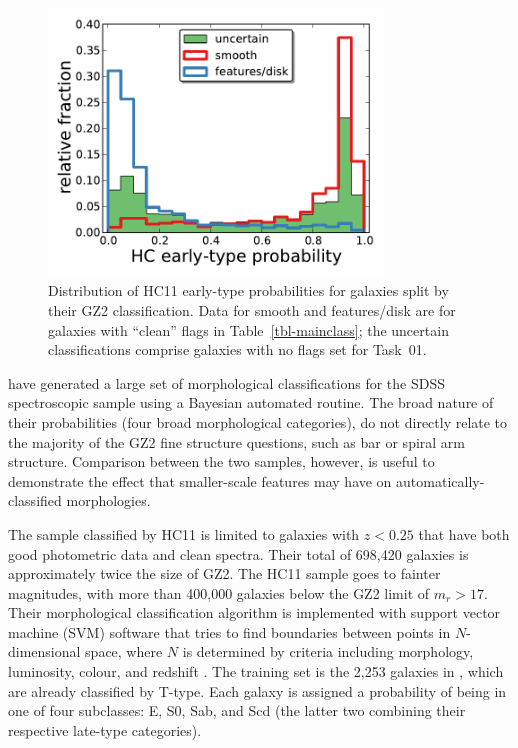 \documentclass[useAMS,usenatbib]{mn2e}
\begin{document}
\begin{figure}
\includegraphics[angle=0,width=3.5in]{figures/hc_histogram.pdf}
\caption{Distribution of HC11 early-type probabilities for galaxies split by their GZ2 classification. Data for smooth and features/disk are for galaxies with ``clean'' flags in Table~\ref{tbl-mainclass}; the uncertain classifications comprise galaxies with no flags set for Task~01. 
\label{fig-hc_histogram}}
\end{figure}

\citet[][HC11]{hue11} have generated a large set of morphological classifications for the SDSS spectroscopic sample using a Bayesian automated routine. The broad nature of their probabilities (four broad morphological categories), do not directly relate to the majority of the GZ2 fine structure questions, such as bar or spiral arm structure. Comparison between the two samples, however, is useful to demonstrate the effect that smaller-scale features may have on automatically-classified morphologies.

The sample classified by HC11 is limited to galaxies with $z<0.25$ that have both good photometric data and clean spectra. Their total of 698,420 galaxies is approximately twice the size of GZ2. The HC11 sample goes to fainter magnitudes, with more than 400,000 galaxies below the GZ2 limit of $m_r>17$. Their morphological classification algorithm is implemented with support vector machine (SVM) software that tries to find boundaries between points in $N$-dimensional space, where $N$ is determined by criteria including morphology, luminosity, colour, and redshift \citep{hue08}. The training set is the 2,253 galaxies in \citet{fuk07}, which are already classified by T-type. Each galaxy is assigned a probability of being in one of four subclasses: E, S0, Sab, and Scd (the latter two combining their respective late-type categories). 
\end{document}
